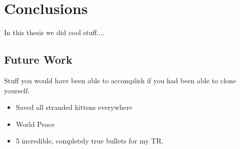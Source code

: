 \chapter{Conclusions}
\label{ch:conclusion}
\glsresetall
{
In this thesis we did cool stuff....
}

\section{Future Work}
{
Stuff you would have been able to accomplish if you had been able to clone yourself. 
\begin{itemize} %

    \item Saved all stranded kittens everywhere
    
    \item World Peace
    
    \item 5 incredible, completely true bullets for my TR.
	
\end{itemize}
}